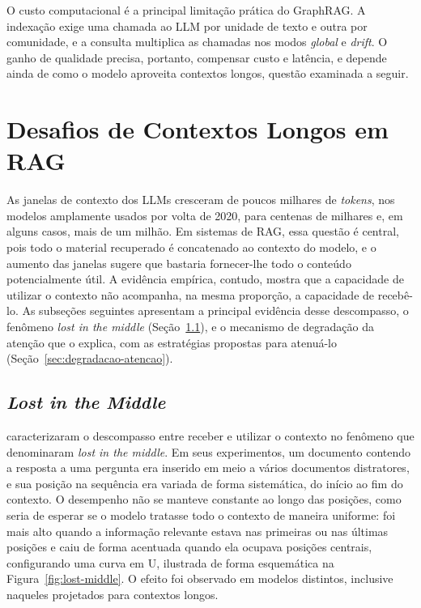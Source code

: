 O custo computacional é a principal limitação prática do GraphRAG. A indexação exige uma chamada ao LLM por unidade de texto e outra por comunidade, e a consulta multiplica as chamadas nos modos \textit{global} e \textit{drift}. O ganho de qualidade precisa, portanto, compensar custo e latência, e depende ainda de como o modelo aproveita contextos longos, questão examinada a seguir.

\FloatBarrier
\section{Desafios de Contextos Longos em RAG}\label{sec:contextos-longos}

As janelas de contexto dos LLMs cresceram de poucos milhares de \textit{tokens}, nos modelos amplamente usados por volta de 2020, para centenas de milhares e, em alguns casos, mais de um milhão. Em sistemas de RAG, essa questão é central, pois todo o material recuperado é concatenado ao contexto do modelo, e o aumento das janelas sugere que bastaria fornecer-lhe todo o conteúdo potencialmente útil. A evidência empírica, contudo, mostra que a capacidade de utilizar o contexto não acompanha, na mesma proporção, a capacidade de recebê-lo. As subseções seguintes apresentam a principal evidência desse descompasso, o fenômeno \textit{lost in the middle} (Seção~\ref{sec:lost-middle}), e o mecanismo de degradação da atenção que o explica, com as estratégias propostas para atenuá-lo (Seção~\ref{sec:degradacao-atencao}).

\subsection{\texorpdfstring{\textit{Lost in the Middle}}{Lost in the Middle}}\label{sec:lost-middle}

\citet{liu2024} caracterizaram o descompasso entre receber e utilizar o contexto no fenômeno que denominaram \textit{lost in the middle}. Em seus experimentos, um documento contendo a resposta a uma pergunta era inserido em meio a vários documentos distratores, e sua posição na sequência era variada de forma sistemática, do início ao fim do contexto. O desempenho não se manteve constante ao longo das posições, como seria de esperar se o modelo tratasse todo o contexto de maneira uniforme: foi mais alto quando a informação relevante estava nas primeiras ou nas últimas posições e caiu de forma acentuada quando ela ocupava posições centrais, configurando uma curva em U, ilustrada de forma esquemática na Figura~\ref{fig:lost-middle}. O efeito foi observado em modelos distintos, inclusive naqueles projetados para contextos longos.

